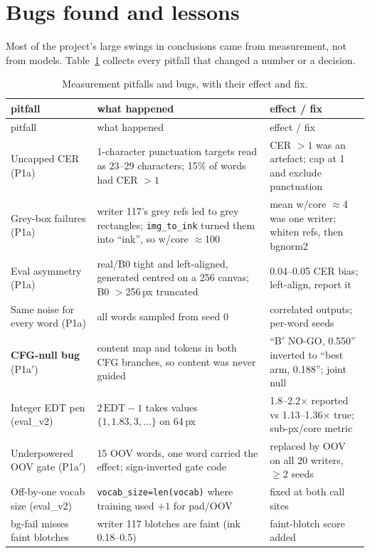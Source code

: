 \documentclass[10.5pt,a4paper]{article}
\newcommand{\Bp}{B$'$}
\begin{document}
\section{Bugs found and lessons}
\label{sec:bugs}

Most of the project's large swings in conclusions came from measurement, not from models. Table~\ref{tab:pitfalls} collects
every pitfall that changed a number or a decision.

\begin{longtable}{@{}p{3.5cm}p{6.6cm}p{5.4cm}@{}}
\caption{Measurement pitfalls and bugs, with their effect and fix.}\label{tab:pitfalls}\\
\toprule
pitfall & what happened & effect / fix \\
\midrule
\endfirsthead
\toprule
pitfall & what happened & effect / fix \\
\midrule
\endhead
\bottomrule
\endfoot
Uncapped CER (P1a) & 1-character punctuation targets read as 23--29 characters; 15\% of words had CER $>1$ & CER $>1$ was an artefact; cap at 1 and exclude punctuation \\
Grey-box failures (P1a) & writer 117's grey refs led to grey rectangles; \texttt{img\_to\_ink} turned them into ``ink'', so w/core $\approx$100 & mean w/core $\approx$4 was one writer; whiten refs, then bgnorm2 \\
Eval asymmetry (P1a) & real/B0 tight and left-aligned, generated centred on a 256 canvas; B0 $>$256\,px truncated & 0.04--0.05 CER bias; left-align, report it \\
Same noise for every word (P1a) & all words sampled from seed 0 & correlated outputs; per-word seeds \\
\textbf{CFG-null bug} (P1a$'$) & content map and tokens in both CFG branches, so content was never guided & ``\Bp{} NO-GO, 0.550'' inverted to ``best arm, 0.188''; joint null \\
Integer EDT pen (eval\_v2) & $2\,\mathrm{EDT}-1$ takes values $\{1,1.83,3,\dots\}$ on 64\,px & 1.8--2.2$\times$ reported vs 1.13--1.36$\times$ true; sub-px/core metric \\
Underpowered OOV gate (P1a$'$) & 15 OOV words, one word carried the effect; sign-inverted gate code & replaced by OOV on all 20 writers, $\ge$2 seeds \\
Off-by-one vocab size (eval\_v2) & \texttt{vocab\_size=len(vocab)} where training used $+1$ for pad/OOV & fixed at both call sites \\
bg-fail misses faint blotches & writer 117 blotches are faint (ink 0.18--0.5) & faint-blotch score added \\

\end{longtable}
\end{document}

